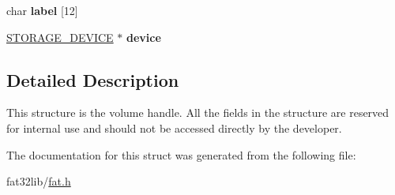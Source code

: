 \begin{DoxyCompactItemize}
\item 
\hypertarget{struct_f_a_t___v_o_l_u_m_e_adc449213afffdc404a78f6dca95d2fee}{char {\bfseries label} \mbox{[}12\mbox{]}}\label{struct_f_a_t___v_o_l_u_m_e_adc449213afffdc404a78f6dca95d2fee}

\item 
\hypertarget{struct_f_a_t___v_o_l_u_m_e_a1fc13df6eae54074dd1e1bad5975ced3}{\hyperlink{struct_s_t_o_r_a_g_e___d_e_v_i_c_e}{S\-T\-O\-R\-A\-G\-E\-\_\-\-D\-E\-V\-I\-C\-E} $\ast$ {\bfseries device}}\label{struct_f_a_t___v_o_l_u_m_e_a1fc13df6eae54074dd1e1bad5975ced3}

\end{DoxyCompactItemize}


\subsection{Detailed Description}
This structure is the volume handle. All the fields in the structure are reserved for internal use and should not be accessed directly by the developer. 

The documentation for this struct was generated from the following file\-:\begin{DoxyCompactItemize}
\item 
fat32lib/\hyperlink{fat_8h}{fat.\-h}\end{DoxyCompactItemize}
